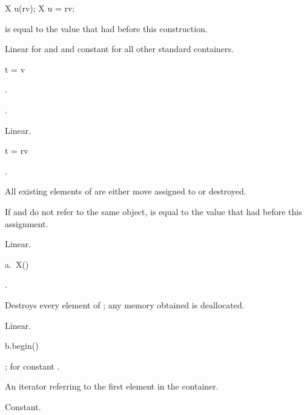 \begin{itemdecl}
X u(rv);
X u = rv;
\end{itemdecl}

\begin{itemdescr}
\pnum
\ensures
{} is equal to the value that  had before this construction.

\pnum
\complexity
Linear for  and  and constant for all other standard containers.
\end{itemdescr}

%
\begin{itemdecl}
t = v
\end{itemdecl}

\begin{itemdescr}
\pnum
\result
{}.

\pnum
\ensures
{}.

\pnum
\complexity
Linear.
\end{itemdescr}

\begin{itemdecl}
t = rv
\end{itemdecl}

\begin{itemdescr}
\pnum
\result
{}.

\pnum
\effects
All existing elements of  are either move assigned to or destroyed.

\pnum
\ensures
If  and  do not refer to the same object,
 is equal to the value that  had before this assignment.

\pnum
\complexity
Linear.
\end{itemdescr}

\begin{itemdecl}
a.~X()
\end{itemdecl}

\begin{itemdescr}
\pnum
\result
{}.

\pnum
\effects
Destroys every element of ; any memory obtained is deallocated.

\pnum
\complexity
Linear.
\end{itemdescr}

%
\begin{itemdecl}
b.begin()
\end{itemdecl}

\begin{itemdescr}
\pnum
\result
{};
 for constant .

\pnum
\returns
An iterator referring to the first element in the container.

\pnum
\complexity
Constant.
\end{itemdescr}

